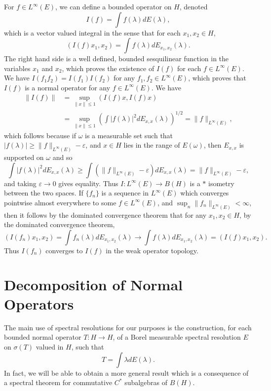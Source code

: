For $f \in L^\infty(E)$, we can define a bounded operator on $H$, denoted
%
\[ I(f) = \int f(\lambda) dE(\lambda), \]
%
which is a vector valued integral in the sense that for each $x_1,x_2 \in H$,
%
\[ \left( I(f) x_1, x_2 \right) = \int f(\lambda) dE_{x_1,x_2}(\lambda). \]
%
The right hand side is a well defined, bounded sesquilinear function in the variables $x_1$ and $x_2$, which proves the existence of $I(f)$ for each $f \in L^\infty(E)$. We have $I(f_1 f_2) = I(f_1) I(f_2)$ for any $f_1, f_2 \in L^\infty(E)$, which proves that $I(f)$ is a normal operator for any $f \in L^\infty(E)$. We have
%
\begin{align*}
    \| I(f) \| &= \sup_{\| x \| \leq 1} (I(f) x, I(f) x)\\
    &= \sup_{\| x \| \leq 1} \left( \int |f(\lambda)|^2 dE_{x,x}(\lambda) \right)^{1/2} = \| f \|_{L^\infty(E)},
\end{align*}
%
which follows because if $\omega$ is a measurable set such that $|f(\lambda)| \geq \| f \|_{L^\infty(E)} - \varepsilon$, and $x \in H$ lies in the range of $E(\omega)$, then $E_{x,x}$ is supported on $\omega$ and so
%
\[ \int |f(\lambda)|^2 dE_{x,x}(\lambda) \geq \int \left( \| f \|_{L^\infty(E)} - \varepsilon \right) dE_{x,x}(\lambda) = \| f \|_{L^\infty(E)} - \varepsilon, \]
%
and taking $\varepsilon \to 0$ gives equality. Thus $I: L^\infty(E) \to B(H)$ is a $*$ isometry between the two spaces. If $\{ f_n \}$ is a sequence in $L^\infty(E)$ which converges pointwise almost everywhere to some $f \in L^\infty(E)$, and $\sup_n \| f_n \|_{L^\infty(E)} < \infty$, then it follows by the dominated convergence theorem that for any $x_1,x_2 \in H$, by the dominated convergence theorem,
%
\[ ( I(f_n) x_1, x_2 ) = \int f_n(\lambda) dE_{x_1,x_2}(\lambda) \to \int f(\lambda) dE_{x_1,x_2}(\lambda) = (I(f) x_1,x_2). \]
%
Thus $I(f_n)$ converges to $I(f)$ in the weak operator topology.

\section{Decomposition of Normal Operators}

The main use of spectral resolutions for our purposes is the construction, for each bounded normal operator $T: H \to H$, of a Borel measurable spectral resolution $E$ on $\sigma(T)$ valued in $H$, such that
%
\[ T = \int \lambda dE(\lambda). \]
%
In fact, we will be able to obtain a more general result which is a consequence of a spectral theorem for commutative $C^*$ subalgebras of $B(H)$.

